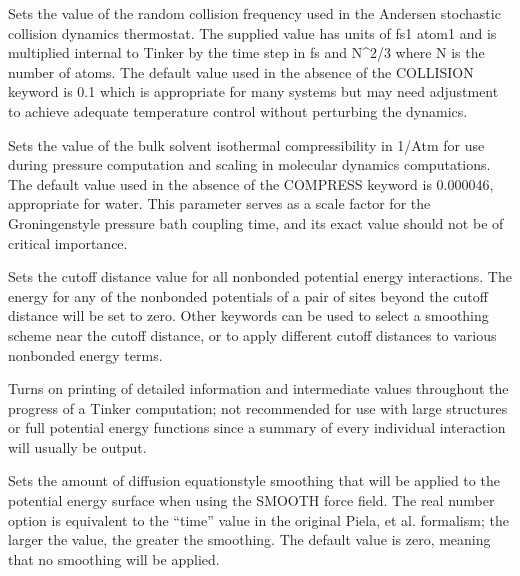 \documentclass[letterpaper,11pt,english]{sphinxmanual}
\begin{document}





  Sets the value of the random collision frequency used in the Andersen stochastic collision dynamics thermostat. The supplied value has units of fs\sphinxhyphen{}1 atom\sphinxhyphen{}1 and is multiplied internal to Tinker by the time step in fs and N\textasciicircum{}2/3 where N is the number of atoms. The default value used in the absence of the COLLISION keyword is 0.1 which is appropriate for many systems but may need adjustment to achieve adequate temperature control without perturbing the dynamics.

  Sets the value of the bulk solvent isothermal compressibility in 1/Atm for use during pressure computation and scaling in molecular dynamics computations. The default value used in the absence of the COMPRESS keyword is 0.000046, appropriate for water. This parameter serves as a scale factor for the Groningen\sphinxhyphen{}style pressure bath coupling time, and its exact value should not be of critical importance.

  Sets the cutoff distance value for all nonbonded potential energy interactions. The energy for any of the nonbonded potentials of a pair of sites beyond the cutoff distance will be set to zero. Other keywords can be used to select a smoothing scheme near the cutoff distance, or to apply different cutoff distances to various nonbonded energy terms.


  Turns on printing of detailed information and intermediate values throughout the progress of a Tinker computation; not recommended for use with large structures or full potential energy functions since a summary of every individual interaction will usually be output.

  Sets the amount of diffusion equation\sphinxhyphen{}style smoothing that will be applied to the potential energy surface when using the SMOOTH force field. The real number option is equivalent to the “time” value in the original Piela, et al. formalism; the larger the value, the greater the smoothing. The default value is zero, meaning that no smoothing will be applied.
\end{document}
